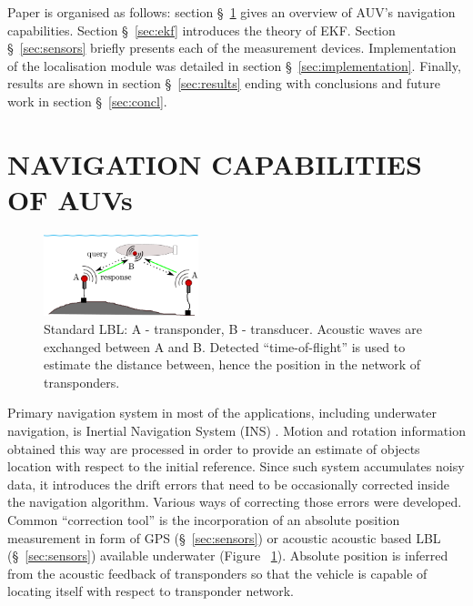 \documentclass[a4paper, 10pt, conference]{ieeeconf}        %
\begin{document}
Paper is organised as follows: section \S~\ref{sec:cap} gives an overview of AUV's navigation capabilities. Section \S~\ref{sec:ekf} introduces the theory of EKF. Section \S~\ref{sec:sensors} briefly presents each of the measurement devices. Implementation of the localisation module was detailed in section \S~\ref{sec:implementation}. Finally, results are shown in section \S~\ref{sec:results} ending with conclusions and future work in section \S~\ref{sec:concl}.
\section{NAVIGATION CAPABILITIES OF AUVs} \label{sec:cap}
\begin{figure}%
  \begin{center}
    \includegraphics[width=0.4\textwidth]{standard-lbl.pdf}
  \end{center}
  \caption{Standard LBL: A - transponder, B - transducer. Acoustic waves are exchanged between A and B. Detected ``time-of-flight'' is used to estimate the distance between, hence the position in the network of transponders.}
  \vspace{-10pt}
  \label{fig:lbl}
\end{figure}
Primary navigation system in most of the applications, including underwater navigation, is Inertial Navigation System (INS) \cite{lawrence98}. Motion and rotation information obtained this way are processed in order to provide an estimate of objects location with respect to the initial reference. Since such system accumulates noisy data, it introduces the drift errors that need to be occasionally corrected inside the navigation algorithm. Various ways of correcting those errors were developed. Common ``correction tool'' is the incorporation of an absolute position measurement in form of GPS (\S~\ref{sec:sensors}) or acoustic acoustic based LBL (\S~\ref{sec:sensors}) available underwater (Figure ~\ref{fig:lbl}). Absolute position is inferred from the acoustic feedback of transponders so that the vehicle is capable of locating itself with respect to transponder network.
\end{document}
